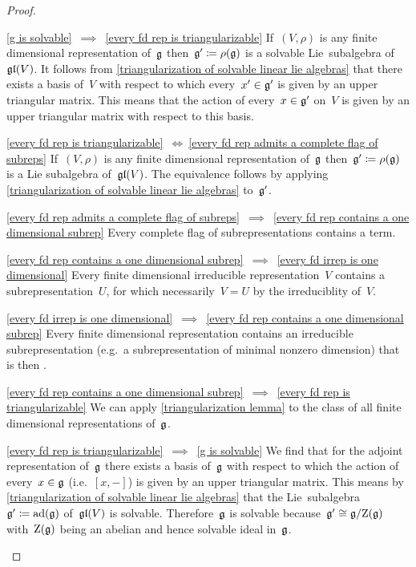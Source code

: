 \begin{proof}
  \leavevmode
  \begin{implicationlist}
    \item[\ref*{g is solvable}~$\implies$~\ref*{every fd rep is triangularizable}]
      If~$(V, \rho)$ is any finite dimensional representation of~$\mathfrak{g}$ then~$\mathfrak{g}' \coloneqq \rho(\mathfrak{g})$ is a solvable Lie~subalgebra of~$\mathfrak{gl}(V)$.
      It follows from \cref{triangularization of solvable linear lie algebras} that there exists a basis of~$V$ with respect to which every~$x' \in \mathfrak{g}'$ is given by an upper triangular matrix.
      This means that the action of every~$x \in \mathfrak{g}'$ on~$V$ is given by an upper triangular matrix with respect to this basis.
    \item[\ref*{every fd rep is triangularizable}~$\iff~$\ref*{every fd rep admits a complete flag of subreps}]
      If~$(V, \rho)$ is any finite dimensional representation of~$\mathfrak{g}$ then~$\mathfrak{g}' \coloneqq \rho(\mathfrak{g})$ is a Lie subalgebra of~$\mathfrak{gl}(V)$.
      The equivalence follows by applying \cref{triangularization of solvable linear lie algebras} to~$\mathfrak{g}'$.
    \item[\ref*{every fd rep admits a complete flag of subreps}~$\implies$~\ref*{every fd rep contains a one dimensional subrep}]
      Every complete flag of subrepresentations contains a {\onedimensional} term.
    \item[\ref*{every fd rep contains a one dimensional subrep}~$\implies$~\ref*{every fd irrep is one dimensional}]
      Every finite dimensional irreducible representation~$V$ contains a {\onedimensional} subrepresentation~$U$, for which necessarily~$V = U$ by the irreduciblity of~$V$.
    \item[\ref*{every fd irrep is one dimensional}~$\implies$~\ref*{every fd rep contains a one dimensional subrep}]
      Every finite dimensional representation contains an irreducible subrepresentation (e.g.\ a subrepresentation of minimal nonzero dimension) that is then {\onedimensional}.
    \item[\ref*{every fd rep contains a one dimensional subrep}~$\implies$~\ref*{every fd rep is triangularizable}]
      We can apply \cref{triangularization lemma} to the class of all finite dimensional representations of~$\mathfrak{g}$.
    \item[\ref*{every fd rep is triangularizable}~$\implies$~\ref*{g is solvable}]
      We find that for the adjoint representation of~$\mathfrak{g}$ there exists a basis of~$\mathfrak{g}$ with respect to which the action of every~$x \in \mathfrak{g}$ (i.e.~$[x,-]$) is given by an upper triangular matrix.
      This means by \cref{triangularization of solvable linear lie algebras} that the Lie~subalgebra~$\mathfrak{g}' \coloneqq \operatorname{ad}(\mathfrak{g})$ of~$\mathfrak{gl}(V)$ is solvable.
      Therefore~$\mathfrak{g}$ is solvable because~$\mathfrak{g}' \cong \mathfrak{g}/{\operatorname{Z}(\mathfrak{g})}$ with~$\operatorname{Z}(\mathfrak{g})$ being an abelian and hence solvable ideal in~$\mathfrak{g}$.
    \qedhere
  \end{implicationlist}
\end{proof}


